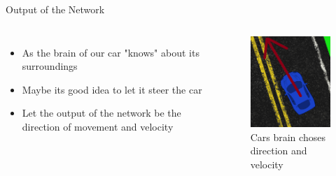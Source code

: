 \documentclass{do}
\begin{document}
\begin{frame}{Output of the Network}
    \begin{columns}
        \column{.6\textheight}
        \begin{itemize}
            \item As the brain of our car "knows" about its surroundings
            \item Maybe its good idea to let it steer the car
            \item Let the output of the network be the direction of movement and velocity 
        \end{itemize} 
        \column{.4\textheight}
        \begin{example}
            \begin{figure}
                \includegraphics[width=1.0\linewidth]{cardir.png}
                \caption{\tiny Cars brain choses direction and velocity}
            \end{figure}
        \end{example}
         
    \end{columns}
\end{frame}
\end{document}
